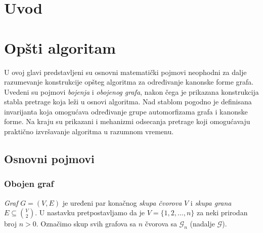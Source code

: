 \documentclass[12pt,oneside]{memoir}
\theoremstyle{definition}
\begin{document}
\frontmatter
\naslovna
\komisija
\apstrakt
\tableofcontents*

\mainmatter

\chapter{Uvod}


\chapter{Opšti algoritam}

 U ovoj glavi predstavljeni su osnovni matematički pojmovi neophodni za dalje
 razumevanje konstrukcije opšteg algoritma za određivanje kanonske forme grafa.
 Uvedeni su pojmovi \emph{bojenja} i \emph{obojenog grafa}, nakon čega je
 prikazana konstrukcija stabla pretrage koja leži u osnovi algoritma. Nad
 stablom pogodno je definisana invarijanta koja omogućava određivanje grupe
 automorfizama grafa i kanonske forme. Na kraju su prikazani i mehanizmi
 odsecanja pretrage koji omogućavaju praktično izvršavanje algoritma u razumnom
 vremenu.

 \section{Osnovni pojmovi}

  \subsection{Obojen graf}

   \emph{Graf} $G = (V, E)$ je uređeni par konačnog \emph{skupa čvorova} $V$ i
   \emph{skupa grana} $E \subseteq {V \choose 2}$. U nastavku pretpostavljamo da
   je $V = \{1, 2, \dots, n\}$ za neki prirodan broj $n > 0$. Označimo skup svih
   grafova sa $n$ čvorova sa $\mathcal{G}_n$ (nadalje $\mathcal{G}$).
\end{document}
